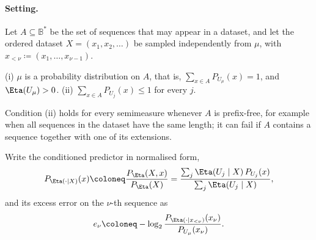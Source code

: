 %
%

\paragraph{Setting.}
Let $A\subseteq\mathbb{B}^*$ be the set of sequences that may appear in a dataset, and let the ordered dataset $X=(x_1,x_2,\dots)$ be sampled independently from $\mu$, with $x_{<\nu}\coloneq(x_1,\dots,x_{\nu-1})$.

\begin{assumption}
\label{ass:hsi-rate}
(i) $\mu$ is a probability distribution on $A$, that is, $\sum_{x\in A}P_{U_\mu}(x)=1$, and $\Eta(U_\mu)>0$.
(ii) $\sum_{x\in A}P_{U_j}(x)\le 1$ for every $j$.
\end{assumption}
Condition (ii) holds for every semimeasure whenever $A$ is prefix-free, for example when all sequences in the dataset have the same length; it can fail if $A$ contains a sequence together with one of its extensions.

Write the conditioned predictor in normalised form,
\[
    P_{\Eta(\cdot\mid X)}(x) \coloneq \frac{P_\Eta(X,x)}{P_\Eta(X)}
    = \frac{\sum_j \Eta(U_j\mid X)\,P_{U_j}(x)}{\sum_j \Eta(U_j\mid X)},
\]
and its excess error on the $\nu$-th sequence as
\[
    e_\nu \coloneq -\log_2\frac{P_{\Eta(\cdot\mid x_{<\nu})}(x_\nu)}{P_{U_\mu}(x_\nu)} .
\]

